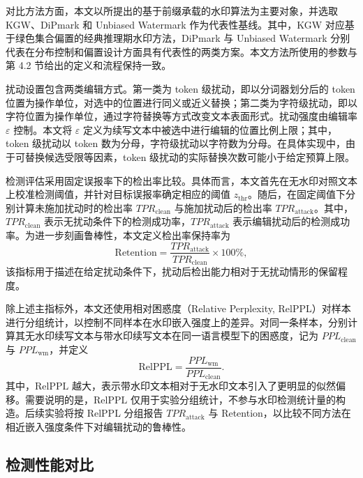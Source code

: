 对比方法方面，本文以所提出的基于前缀承载的水印算法为主要对象，并选取 KGW\cite{kirchenbauer2023watermark}、DiPmark\cite{wu2023dipmark} 和 Unbiased Watermark\cite{hu2023unbiased} 作为代表性基线。其中，KGW 对应基于绿色集合偏置的经典推理期水印方法，DiPmark 与 Unbiased Watermark 分别代表在分布控制和偏置设计方面具有代表性的两类方案。本文方法所使用的参数与第 4.2 节给出的定义和流程保持一致。

扰动设置包含两类编辑方式。第一类为 token 级扰动，即以分词器划分后的 token 位置为操作单位，对选中的位置进行同义或近义替换；第二类为字符级扰动，即以字符位置为操作单位，通过字符替换等方式改变文本表面形式。扰动强度由编辑率 $\varepsilon$ 控制。本文将 $\varepsilon$ 定义为续写文本中被选中进行编辑的位置比例上限；其中，token 级扰动以 token 数为分母，字符级扰动以字符数为分母。在具体实现中，由于可替换候选受限等因素，token 级扰动的实际替换次数可能小于给定预算上限。

检测评估采用固定误报率下的检出率比较。具体而言，本文首先在无水印对照文本上校准检测阈值，并针对目标误报率确定相应的阈值 $z_{\mathrm{thr}}$。随后，在固定阈值下分别计算未施加扰动时的检出率 $TPR_{\mathrm{clean}}$ 与施加扰动后的检出率 $TPR_{\mathrm{attack}}$。其中，$TPR_{\mathrm{clean}}$ 表示无扰动条件下的检测成功率，$TPR_{\mathrm{attack}}$ 表示编辑扰动后的检测成功率。为进一步刻画鲁棒性，本文定义检出率保持率为
\begin{equation}
\mathrm{Retention}
=
\frac{TPR_{\mathrm{attack}}}{TPR_{\mathrm{clean}}}\times 100\%,
\label{eq:retention}
\end{equation}
该指标用于描述在给定扰动条件下，扰动后检出能力相对于无扰动情形的保留程度。

除上述主指标外，本文还使用相对困惑度（Relative Perplexity, RelPPL）对样本进行分组统计，以控制不同样本在水印嵌入强度上的差异。对同一条样本，分别计算其无水印续写文本与带水印续写文本在同一语言模型下的困惑度，记为 $PPL_{\mathrm{clean}}$ 与 $PPL_{\mathrm{wm}}$，并定义
\begin{equation}
\mathrm{RelPPL}
=
\frac{PPL_{\mathrm{wm}}}{PPL_{\mathrm{clean}}}.
\label{eq:relppl}
\end{equation}
其中，$\mathrm{RelPPL}$ 越大，表示带水印文本相对于无水印文本引入了更明显的似然偏移。需要说明的是，$\mathrm{RelPPL}$ 仅用于实验分组统计，不参与水印检测统计量的构造。后续实验将按 RelPPL 分组报告 $TPR_{\mathrm{attack}}$ 与 Retention，以比较不同方法在相近嵌入强度条件下对编辑扰动的鲁棒性。

\FloatBarrier
\subsection{检测性能对比}

